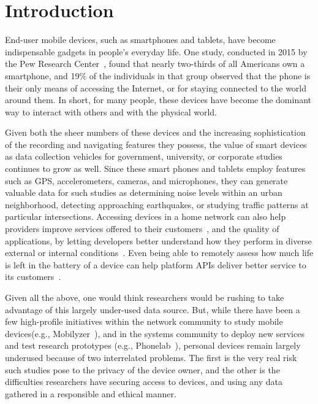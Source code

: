 \section{Introduction}

End-user mobile devices, such as smartphones and tablets, have become
indispensable gadgets in people's everyday life. One study, conducted
in 2015 by the Pew Research Center~\cite{phone2015}, found that nearly two-thirds of
all Americans own a smartphone, and 19\% of the individuals in that
group observed that the phone is their only means of accessing the
Internet, or for staying connected to the world around them. In short,
for many people, these devices have become the dominant way to
interact with others and with the physical world.

Given both the sheer numbers of these devices and the increasing
sophistication of the recording and navigating features they possess,
the value of smart devices as data collection vehicles for government,
university, or corporate studies continues to grow as well. Since
these smart phones and tablets employ features such as GPS,
accelerometers, cameras, and microphones, they can generate valuable
data for such studies as determining noise levels within an urban
neighborhood, detecting approaching earthquakes, or studying traffic
patterns at particular intersections. Accessing devices in a home
network can also help providers improve services offered to their
customers~\cite{sundaresan2011broadband}, and the quality of
applications, by letting developers better understand how they perform
in diverse external or internal
conditions~\cite{ravindranath2012appinsight}. Even being able to
remotely assess how much life is left in the battery of a device can
help platform APIs deliver better service to its
customers~\cite{battery}.

Given all the above, one would think researchers would be rushing to
take advantage of this largely under-used data source. But, while
there have been a few high-profile initiatives within the network
community to study mobile devices(e.g.,
Mobilyzer~\cite{nikravesh2015mobilyzer}), and in the systems community
to deploy new services and test research prototypes (e.g.,
Phonelab~\cite{phonelab, nandugudi2013phonelab}), personal devices
remain largely underused because of two interrelated problems. The
first is the very real risk such studies pose to the privacy of the
device owner, and the other is the difficulties researchers have
securing access to devices, and using any data gathered in a
responsible and ethical manner.
					
